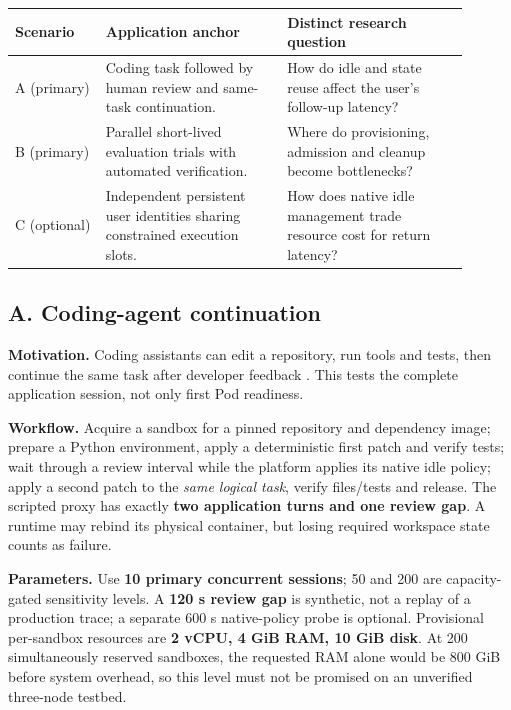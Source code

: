 \documentclass[
  a4paper,
]{article}
\begin{document}
{\small
\begin{longtable}{@{}p{0.18\linewidth}p{0.36\linewidth}p{0.36\linewidth}@{}}
\toprule
Scenario & Application anchor & Distinct research question\\
\midrule
\endhead
\bottomrule
\endlastfoot
A (primary) &
Coding task followed by human review
and same-task continuation. &
How do idle and state reuse affect
the user's follow-up latency?\\
B (primary) &
Parallel short-lived evaluation trials
with automated verification. &
Where do provisioning, admission
and cleanup become bottlenecks?\\
C (optional) &
Independent persistent user identities
sharing constrained execution slots. &
How does native idle management
trade resource cost for return latency?\\
\end{longtable}
}

\subsection{A. Coding-agent continuation}
\label{scenario-a-coding-agent-continuation}

\textbf{Motivation.} Coding assistants can
edit a repository, run tools and tests,
then continue the same task after
developer feedback \cite{codexCloud,sweAgent}.
This tests the complete application session,
not only first Pod readiness.

\textbf{Workflow.} Acquire a sandbox for a
pinned repository and dependency image;
prepare a Python environment, apply
a deterministic first patch and verify tests;
wait through a review interval while
the platform applies its native idle policy;
apply a second patch to the \emph{same logical
task}, verify files/tests and release.
The scripted proxy has exactly
\textbf{two application turns and one
review gap}. A runtime may rebind its
physical container, but losing required
workspace state counts as failure.

\textbf{Parameters.} Use \textbf{10 primary
concurrent sessions}; 50 and 200 are
capacity-gated sensitivity levels.
A \textbf{120 s review gap} is synthetic,
not a replay of a production trace;
a separate 600 s native-policy probe
is optional. Provisional per-sandbox
resources are \textbf{2 vCPU,
4 GiB RAM, 10 GiB disk}. At 200
simultaneously reserved sandboxes,
the requested RAM alone would be
800 GiB before system overhead,
so this level must not be promised
on an unverified three-node testbed.
\end{document}
